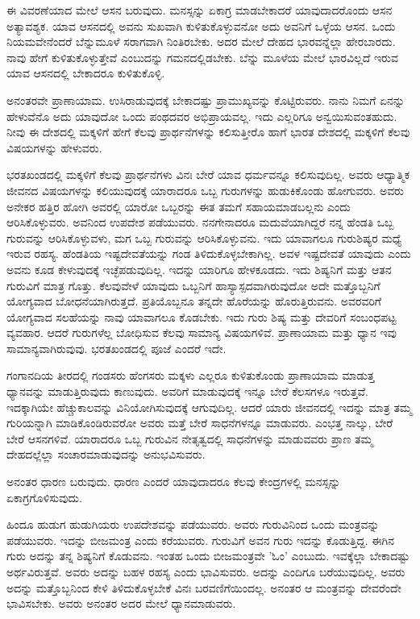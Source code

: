 ಈ ವಿವರಣೆಯಾದ ಮೇಲೆ ಆಸನ ಬರುವುದು. ಮನಸ್ಸನ್ನು ಏಕಾಗ್ರ ಮಾಡಬೇಕಾದರೆ ಯಾವುದಾದರೊಂದು ಆಸನ ಅತ್ಯಾವಶ್ಯಕ. ಯಾವ ಆಸನದಲ್ಲಿ ಅವನು ಸುಖವಾಗಿ ಕುಳಿತುಕೊಳ್ಳುವನೋ ಅದು ಅವನಿಗೆ ಒಳ್ಳೆಯ ಆಸನ. ಒಂದು ನಿಯಮವೇನೆಂದರೆ ಬೆನ್ನುಮೂಳೆ ಸರಾಗವಾಗಿ ನಿಂತಿರಬೇಕು. ಅದರ ಮೇಲೆ ದೇಹದ ಭಾರವನ್ನೆಲ್ಲಾ ಹೇರಬಾರದು. ನಾವು ಹೇಗೆ ಕುಳಿತುಕೊಳ್ಳುತ್ತೇವೆ ಎಂಬುದನ್ನು ಗಮನದಲ್ಲಿಡಬೇಕು. ಬೆನ್ನು ಮೂಳೆಯ ಮೇಲೆ ಭಾರವಿಲ್ಲದೆ ಇರುವ ಯಾವ ಆಸನದಲ್ಲಿ ಬೇಕಾದರೂ ಕುಳಿತುಕೊಳ್ಳಿ.

ಅನಂತರವೇ ಪ್ರಾಣಾಯಾಮ. ಉಸಿರಾಡುವುದಕ್ಕೆ ಬೇಕಾದಷ್ಟು ಪ್ರಾಮುಖ್ಯವನ್ನು ಕೊಟ್ಟಿರುವರು. ನಾನು ನಿಮಗೆ ಏನನ್ನು ಹೇಳುವೆನೊ ಅದು ಯಾವುದೋ ಒಂದು ಪಂಥದವರ ಅಭಿಪ್ರಾಯವಲ್ಲ. ಇದು ಎಲ್ಲರಿಗೂ ಅನ್ವಯಿಸುವಂತಹುದು. ನೀವು ಈ ದೇಶದಲ್ಲಿ ಮಕ್ಕಳಿಗೆ ಹೇಗೆ ಕೆಲವು ಪ್ರಾರ್ಥನೆಗಳನ್ನು ಕಲಿಸುತ್ತೀರೊ ಹಾಗೆ ಭಾರತ ದೇಶದಲ್ಲಿ ಮಕ್ಕಳಿಗೆ ಕೆಲವು ವಿಷಯಗಳನ್ನು ಹೇಳುವರು.

ಭರತಖಂಡದಲ್ಲಿ ಮಕ್ಕಳಿಗೆ ಕೆಲವು ಪ್ರಾರ್ಥನೆಗಳು ವಿನಃ ಬೇರೆ ಯಾವ ಧರ್ಮವನ್ನೂ ಕಲಿಸುವುದಿಲ್ಲ. ಅವರು ಆಧ್ಯಾತ್ಮಿಕ ಜೀವನದ ವಿಷಯಗಳನ್ನು ಕಲಿಯುವುದಕ್ಕೆ ಯಾರಾದರೂ ಒಬ್ಬ ಗುರುಗಳನ್ನು ಹುಡುಕಿಕೊಂಡು ಹೋಗುವರು. ಅವರು ಅನೇಕರ ಹತ್ತಿರ ಹೋಗಿ ಅವರಲ್ಲಿ ಯಾರೋ ಒಬ್ಬರನ್ನು ಈತ ತಮಗೆ ಸಹಾಯಮಾಡಬಲ್ಲನು ಎಂದು ಆರಿಸಿಕೊಳ್ಳುವರು. ಅವನಿಂದ ಉಪದೇಶ ಪಡೆಯುವರು. ನನಗೇನಾದರೂ ಮದುವೆಯಾಗಿದ್ದರೆ ನನ್ನ ಹೆಂಡತಿ ಒಬ್ಬ ಗುರುವನ್ನು ಆರಿಸಿಕೊಳ್ಳುವಳು, ಮಗ ಒಬ್ಬ ಗುರುವನ್ನು ಆರಿಸಿಕೊಳ್ಳುವನು. ಇದು ಯಾವಾಗಲೂ ಗುರುಶಿಷ್ಯರ ಮಧ್ಯೆ ಇರುವ ರಹಸ್ಯ. ಹೆಂಡತಿಯ ಇಷ್ಟದೇವತೆಯನ್ನು ಗಂಡ ತಿಳಿದುಕೊಳ್ಳಬೇಕಾಗಿಲ್ಲ. ಅವಳ ಇಷ್ಟದೇವತೆ ಯಾವುದು ಎಂದು ಅವನು ಕೂಡ ಕೇಳುವುದಕ್ಕೆ ಇಚ್ಛೆಪಡುವುದಿಲ್ಲ. ಇದನ್ನು ಯಾರಿಗೂ ಹೇಳಕೂಡದು. ಇದು ಶಿಷ್ಯನಿಗೆ ಮತ್ತು ಆತನ ಗುರುವಿಗೆ ಮಾತ್ರ ಗೊತ್ತು. ಕೆಲವುವೇಳೆ ಯಾವುದು ಒಬ್ಬನಿಗೆ ಹಾಸ್ಯಾಸ್ಪದವಾಗಿರುವುದೋ ಅದೇ ಮತ್ತೊಬ್ಬನಿಗೆ ಯೋಗ್ಯವಾದ ಬೋಧನೆಯಾಗಿರುತ್ತದೆ. ಪ್ರತಿಯೊಬ್ಬನೂ ತನ್ನದೇ ಹೊರೆಯನ್ನು ಹೊರುತ್ತಿರುವನು. ಅವರವರಿಗೆ ಯೋಗ್ಯವಾದ ಸಲಹೆಯನ್ನು ನಾವು ಯಾವಾಗಲೂ ಕೊಡಬೇಕು. ಇದು ಗುರು ಶಿಷ್ಯ ಮತ್ತು ದೇವರಿಗೆ ಸಂಬಂಧಪಟ್ಟ ವ್ಯವಹಾರ. ಆದರೆ ಗುರುಗಳೆಲ್ಲ ಬೋಧಿಸುವ ಕೆಲವು ಸಾಮಾನ್ಯ ವಿಷಯಗಳಿವೆ. ಪ್ರಾಣಾಯಾಮ ಮತ್ತು ಧ್ಯಾನ ಇವು ಸಾಮಾನ್ಯವಾಗಿರುವುವು. ಭರತಖಂಡದಲ್ಲಿ ಪೂಜೆ ಎಂದರೆ ಇದೇ.

ಗಂಗಾನದಿಯ ತೀರದಲ್ಲಿ ಗಂಡಸರು ಹೆಂಗಸರು ಮಕ್ಕಳು ಎಲ್ಲರೂ ಕುಳಿತುಕೊಂಡು ಪ್ರಾಣಾಯಾಮ ಮಾಡುತ್ತ ಧ್ಯಾನವನ್ನು ಮಾಡುತ್ತಿರುವುದು ಕಾಣುವುದು. ಅವರಿಗೆ ಮಾಡುವುದಕ್ಕೆ ಇನ್ನೂ ಬೇರೆ ಕೆಲಸಗಳೂ ಇರುತ್ತವೆ. ಇದಕ್ಕಾಗಿಯೇ ಹೆಚ್ಚುಕಾಲವನ್ನು ವಿನಿಯೋಗಿಸುವುದಕ್ಕೆ ಆಗುವುದಿಲ್ಲ. ಆದರೆ ಯಾರು ಜೀವನದಲ್ಲಿ ಇದನ್ನು ಮಾತ್ರ ತಮ್ಮ ಗುರಿಯನ್ನಾಗಿ ಮಾಡಿಕೊಂಡಿರುವರೋ ಅವರು ಮತ್ತೆ ಬೇರೆ ಸಾಧನೆಗಳನ್ನೂ ಮಾಡುವರು. ಎಂಭತ್ತ ನಾಲ್ಕು, ಬೇರೆ ಬೇರೆ ಆಸನಗಳಿವೆ. ಯಾರಾದರೂ ಒಬ್ಬ ಗುರುವಿನ ನೇತೃತ್ವದಲ್ಲಿ ಸಾಧನೆಗಳನ್ನು ಮಾಡುವವರು ಪ್ರಾಣ ತಮ್ಮ ದೇಹದಲ್ಲೆಲ್ಲಾ ಸಂಚಾರಮಾಡುವುದನ್ನು ಅನುಭವಿಸುವರು.

ಅನಂತರ ಧಾರಣ ಬರುವುದು. ಧಾರಣ ಎಂದರೆ ಯಾವುದಾದರೂ ಕೆಲವು ಕೇಂದ್ರಗಳಲ್ಲಿ ಮನಸ್ಸನ್ನು ಏಕಾಗ್ರಗೊಳಿಸುವುದು.

ಹಿಂದೂ ಹುಡುಗ ಹುಡುಗಿಯರು ಉಪದೇಶವನ್ನು ಪಡೆಯುವರು. ಅವರು ಗುರುವಿನಿಂದ ಒಂದು ಮಂತ್ರವನ್ನು ಪಡೆಯುವರು. ಇದನ್ನು ಬೀಜಮಂತ್ರ ಎಂದು ಕರೆಯುವರು. ಗುರುವಿಗೆ ಅವನ ಗುರು ಇದನ್ನು ಕೊಡುತ್ತಿದ್ದ. ಈಗಿನ ಗುರು ಅದನ್ನು ತನ್ನ ಶಿಷ್ಯನಿಗೆ ಕೊಡುವನು. ಇಂತಹ ಒಂದು ಬೀಜಮಂತ್ರವೇ 'ಓಂ' ಎಂಬುದು. ಇವಕ್ಕೆಲ್ಲಾ ಬೇಕಾದಷ್ಟು ಅರ್ಥವಿರುತ್ತವೆ. ಅವರು ಅದನ್ನು ಬಹಳ ರಹಸ್ಯ ಎಂದು ಭಾವಿಸುವರು. ಅದನ್ನು ಎಂದಿಗೂ ಬರೆಯುವುದಿಲ್ಲ. ಅವರು ಅದನ್ನು ಮತ್ತೊಬ್ಬನಿಂದ ಕೇಳಿ ತಿಳಿದುಕೊಳ್ಳಬೇಕೆ ವಿನಃ ಬರವಣಿಗೆಯಿಂದಲ್ಲ. ಅನಂತರ ಆ ಮಂತ್ರವನ್ನು ದೇವರೆಂದೇ ಭಾವಿಸಬೇಕು. ಅವರು ಅನಂತರ ಅದರ ಮೇಲೆ ಧ್ಯಾನಮಾಡುವರು.

